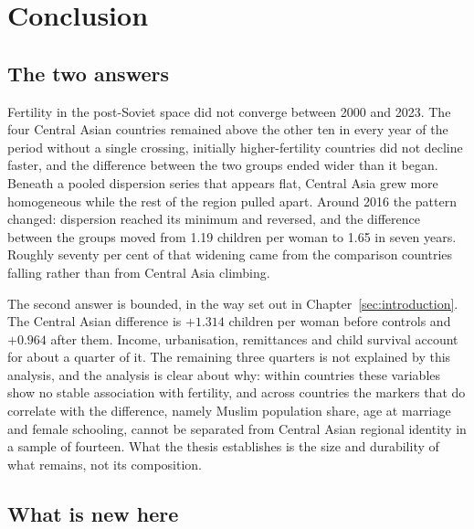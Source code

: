
\section{Conclusion}
\label{sec:conclusion}

\subsection{The two answers}
\label{sec:two-answers}

Fertility in the post-Soviet space did not converge between 2000 and 2023. The four Central Asian countries remained above the other ten in every year of the period without a single crossing, initially higher-fertility countries did not decline faster, and the difference between the two groups ended wider than it began. Beneath a pooled dispersion series that appears flat, Central Asia grew more homogeneous while the rest of the region pulled apart. Around 2016 the pattern changed: dispersion reached its minimum and reversed, and the difference between the groups moved from 1.19 children per woman to 1.65 in seven years. Roughly seventy per cent of that widening came from the comparison countries falling rather than from Central Asia climbing.

The second answer is bounded, in the way set out in Chapter~\ref{sec:introduction}. The Central Asian difference is $+1.314$ children per woman before controls and $+0.964$ after them. Income, urbanisation, remittances and child survival account for about a quarter of it. The remaining three quarters is not explained by this analysis, and the analysis is clear about why: within countries these variables show no stable association with fertility, and across countries the markers that do correlate with the difference, namely Muslim population share, age at marriage and female schooling, cannot be separated from Central Asian regional identity in a sample of fourteen. What the thesis establishes is the size and durability of what remains, not its composition.

\subsection{What is new here}
\label{sec:contribution}

